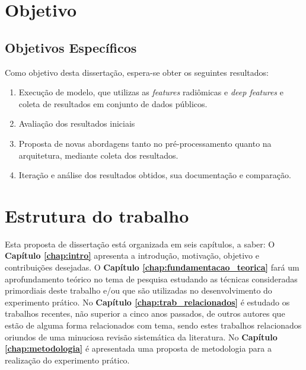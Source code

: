 \newpage

\section{Objetivo}
\label{sec:cap1_objetivo}

\subsection{Objetivos Específicos}

Como objetivo desta dissertação, espera-se obter os seguintes resultados:

\begin{enumerate}

\item Execução de modelo, que utilizas as \textit{features} radiômicas e
\textit{deep features} e coleta de resultados em conjunto de dados públicos.

\item Avaliação dos resultados iniciais

\item Proposta de novas abordagens tanto no pré-processamento quanto na arquitetura, mediante coleta dos resultados.

\item Iteração e análise dos resultados obtidos, sua documentação e comparação.
\end{enumerate}

\section{Estrutura do trabalho}
\label{sec:cap1_estrutura_trabalho}

Esta proposta de dissertação está organizada em seis capítulos, a saber:
O \textbf{Capítulo \ref{chap:intro}} apresenta a introdução, motivação, objetivo e contribuições desejadas. O \textbf{Capítulo \ref{chap:fundamentacao_teorica}} fará um aprofundamento teórico no tema de pesquisa estudando as técnicas consideradas primordiais deste trabalho e/ou que são utilizadas no desenvolvimento do experimento prático. No \textbf{Capítulo \ref{chap:trab_relacionados}} é estudado  os trabalhos recentes, não superior a cinco anos passados, de outros autores que estão de alguma forma relacionados com tema, sendo estes trabalhos relacionados oriundos de uma minuciosa revisão sistemática da literatura. No \textbf{Capítulo \ref{chap:metodologia}} é apresentada uma proposta de metodologia para a realização do experimento prático.

